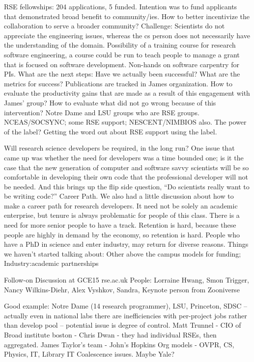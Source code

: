 RSE fellowships: 204 applications, 5 funded. Intention was to fund applicants that demonstrated broad benefit to community/ies. How to better incentivize the collaboration to serve a broader community? Challenge: Scientists do not appreciate the engineering issues, whereas the cs person does not necessarily have the understanding of the domain.
Possibility of a training course for research software engineering, a course could be run to teach people to manage a grant that is focused on software development. Non-hands on software carpentry for PIs.
What are the next steps:
Have we actually been successful?
What are the metrics for success?
Publications are tracked in James organization.
How to evaluate the productivity gains that are made as a result of this engagement with James’ group?
How to evaluate what did not go wrong because of this intervention?
Notre Dame and LSU groups who are RSE groups.
NCEAS/SOCSYNC; some RSE support; NESCENT/NIMBIOS also.
The power of the label? Getting the word out about RSE support using the label.








Will research science developers be required, in the long run?
One issue that came up was whether the need for developers was a time bounded one; is it the case that the new generation of computer and software savvy scientists will be so comfortable in developing their own code that the professional developer will not be needed.  And this brings up the flip side question, “Do scientists really want to be writing code?”
Career Path.
We also had a little discussion about how to make a career path for research developers. It need not be solely an academic enterprise, but tenure is always problematic for people of this class. There is a need for more senior people to have a track. Retention is hard, because these people are highly in demand by the economy, so retention is hard. People who have a PhD in science and enter industry, may return for diverse reasons.
Things we haven’t started talking about:
Other above the campus models for funding;
Industry:academic partnerships


Follow-on Discussion at GCE15
rse.ac.uk
People: Lorraine Hwang, Smon Trigger, Nancy Wilkins-Diehr,  Alex Vyshkov, Sandra, Keynote person from Zooniverse

Good example: Notre Dame (14 research programmer), LSU, Princeton,
SDSC -- actually even in national labs there are inefficiencies with per-project jobs rather than develop pool -- potential issue is degree of control.
Matt Trunnel - CIO of Broad institute boston - Chris Dwan - they had individual RSEs, then aggregated.
James Taylor’s team  - John’s Hopkins
Org models - OVPR, CS, Physics, IT, Library
IT Coalescence issues.
Maybe Yale?



